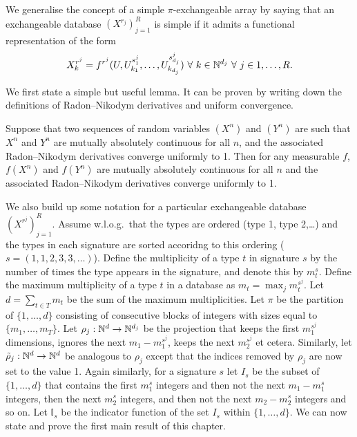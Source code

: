 We generalise the concept of a simple $\pi$-exchangeable array by saying that an exchangeable database $(X^{r_j})_{j=1}^R$ is simple if it admits a functional representation of the form
\begin{equation}
  X^{r^j}_{k} = f^{r^j}(U, U^{s^{j}_1}_{k_1},\dots,U^{s^{j}_{d_j}}_{k_{d_j}}) \,\, \forall \,\, k \in \mathbb{N}^{d_j} \,\, \forall \,\, j \in {1,\dots,R}.
\end{equation}

We first state a simple but useful lemma.
It can be proven by writing down the definitions of Radon--Nikodym derivatives and uniform convergence.

\begin{lem}
  \label{lem:contractionrnd}
  Suppose that two sequences of random variables $(X^n)$ and $(Y^n)$ are such that $X^n$ and $Y^n$ are mutually absolutely continuous for all $n$, and the associated Radon--Nikodym derivatives converge uniformly to 1.
  Then for any measurable $f$, $f(X^n)$ and $f(Y^n)$ are mutually absolutely continuous for all $n$ and the associated Radon--Nikodym derivatives converge uniformly to 1.
\end{lem}

We also build up some notation for a particular exchangeable database $(X^{r^j})_{j=1}^R$.%
Assume w.l.o.g.\ that the types are ordered (\eg type 1, type 2,\dots) and the types in each signature are sorted accoridng to this ordering (\eg $s = (1,1,2,3,3,\dots)$).
Define the multiplicity of a type $t$ in signature $s$ by the number of times the type appears in the signature, and denote this by $m_{t}^s$.
Define the maximum multiplicity of a type $t$ in a database as $m_t = \max_j m_t^{s^j}$.
Let $d = \sum_{t\in T} m_t$ be the sum of the maximum multiplicities.
Let $\pi$ be the partition of $\{1,\ldots,d\}$ consisting of consecutive blocks of integers with sizes equal to $\{m_1,\ldots,m_T\}$.
Let $\rho_j : \mathbb{N}^d \to \mathbb{N}^{d_j}$ be the projection that keeps the first $m_{1}^{s^j}$ dimensions, ignores the next $m_1 - m_{1}^{s^j}$, keeps the next $m_{2}^{s^j}$ et cetera.
Similarly, let $\tilde{\rho}_j : \mathbb{N}^d \to \mathbb{N}^d$ be analogous to $\rho_j$ except that the indices removed by $\rho_j$ are now set to the value 1.
Again similarly, for a signature $s$ let $I_s$ be the subset of $\{1,\ldots,d\}$ that contains the first $m_1^s$ integers and then not the next $m_1 - m_1^s$ integers, then the next $m_2^s$ integers, and then not the next $m_2 - m_2^s$ integers and so on.
Let $\mathbb{I}_s$ be the indicator function of the set $I_s$ within $\{1,\ldots,d\}$.
We can now state and prove the first main result of this chapter.

